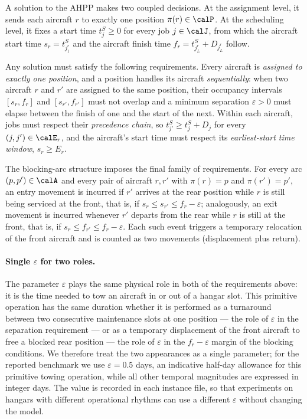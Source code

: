 A solution to the AHPP makes two coupled decisions.  At the assignment
level, it sends each aircraft $r$ to exactly one position $\pi(r) \in \calP$.
At the scheduling level, it fixes a start time $t^S_j \ge 0$ for every job
$j \in \calJ$, from which the aircraft start time $s_r = t^S_{j^r_1}$ and
the aircraft finish time $f_r = t^S_{j^r_L} + D_{j^r_L}$ follow.

Any solution must satisfy the following requirements.  Every aircraft is
\emph{assigned to exactly one position}, and a position handles its
aircraft \emph{sequentially}: when two aircraft $r$ and $r'$ are assigned
to the same position, their occupancy intervals
$[s_r, f_r]$ and $[s_{r'}, f_{r'}]$ must not overlap and a minimum
separation $\varepsilon > 0$ must elapse between the finish of one and the
start of the next.  Within each aircraft,
jobs must respect their \emph{precedence chain}, so $t^S_{j'} \ge t^S_j +
D_j$ for every $(j, j') \in \calE_r$, and the aircraft's start time must
respect its \emph{earliest-start time window}, $s_r \ge E_r$.

The blocking-arc structure imposes the final family of requirements.  For
every arc $(p, p') \in \calA$ and every pair of aircraft $r, r'$ with
$\pi(r) = p$ and $\pi(r') = p'$, an entry movement is incurred if $r'$
arrives at the rear position while $r$ is still being serviced at the
front, that is, if $s_r \le s_{r'} \le f_r - \varepsilon$; analogously,
an exit movement is incurred whenever $r'$ departs from the rear while
$r$ is still at the front, that is, if $s_r \le f_{r'} \le f_r -
\varepsilon$.  Each such event triggers a temporary relocation of the
front aircraft and is counted as two movements (displacement plus return).

\paragraph{Single $\varepsilon$ for two roles.}
The parameter $\varepsilon$ plays the same physical role in both of the
requirements above: it is the time needed to tow an aircraft in or out of
a hangar slot.  This primitive operation has the same duration whether it
is performed as a turnaround between two consecutive maintenance slots at
one position --- the role of $\varepsilon$ in the separation requirement
--- or as a temporary displacement of the front aircraft to free a
blocked rear position --- the role of $\varepsilon$ in the
$f_r - \varepsilon$ margin of the blocking conditions.  We therefore
treat the two appearances as a single parameter; for the reported
benchmark we use $\varepsilon = 0.5$ days, an indicative half-day
allowance for this primitive towing operation, while all other temporal
magnitudes are expressed in integer days.  The value is recorded in each
instance file, so that experiments on hangars with different operational
rhythms can use a different $\varepsilon$ without changing the model.

